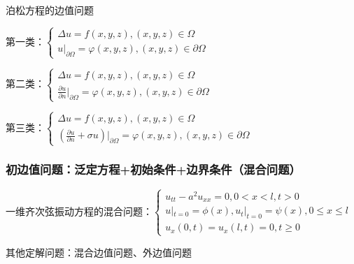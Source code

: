 泊松方程的边值问题

第一类：\(\begin{cases}\Delta u=f(x,y,z),(x,y,z)\in\Omega\\u|_{\partial\Omega}=\varphi(x,y,z),(x,y,z)\in\partial\Omega\end{cases}\)

第二类：\(\begin{cases}\Delta u=f(x,y,z),(x,y,z)\in\Omega\\\frac{\partial u}{\partial n}|_{\partial\Omega}=\varphi(x,y,z),(x,y,z)\in\partial\Omega\end{cases}\)

第三类：\(\begin{cases}\Delta u=f(x,y,z),(x,y,z)\in\Omega\\(\frac{\partial u}{\partial n}+\sigma u)|_{\partial\Omega}=\varphi(x,y,z),(x,y,z)\in\partial\Omega\end{cases}\)

\subsubsection{初边值问题：泛定方程+初始条件+边界条件（混合问题）}

一维齐次弦振动方程的混合问题：\(\begin{cases}u_{tt}-a^2u_{xx}=0,0<x<l,t>0\\u|_{t=0}=\phi(x),u_t|_{t=0}=\psi(x),0\le x\le l\\u_x\left(0,t\right)=u_x\left(l,t\right)=0,t\geq0\end{cases}\)

其他定解问题：混合边值问题、外边值问题

